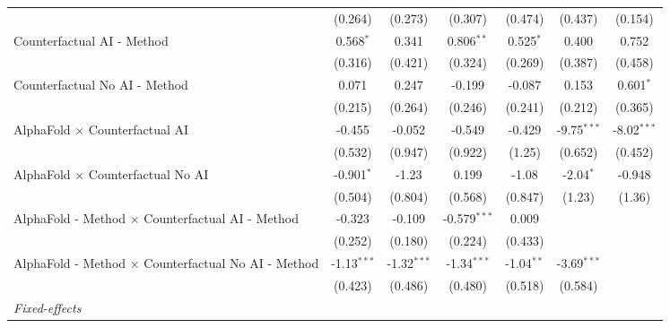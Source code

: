 \begin{tabular}{lcccccc}
                                                              & (0.264)       & (0.273)       & (0.307)        & (0.474)       & (0.437)       & (0.154)\\   
   Counterfactual AI - Method                                 & 0.568$^{*}$   & 0.341         & 0.806$^{**}$   & 0.525$^{*}$   & 0.400         & 0.752\\   
                                                              & (0.316)       & (0.421)       & (0.324)        & (0.269)       & (0.387)       & (0.458)\\   
   Counterfactual No AI - Method                              & 0.071         & 0.247         & -0.199         & -0.087        & 0.153         & 0.601$^{*}$\\   
                                                              & (0.215)       & (0.264)       & (0.246)        & (0.241)       & (0.212)       & (0.365)\\   
   AlphaFold $\times$ Counterfactual AI                       & -0.455        & -0.052        & -0.549         & -0.429        & -9.75$^{***}$ & -8.02$^{***}$\\   
                                                              & (0.532)       & (0.947)       & (0.922)        & (1.25)        & (0.652)       & (0.452)\\   
   AlphaFold $\times$ Counterfactual No AI                    & -0.901$^{*}$  & -1.23         & 0.199          & -1.08         & -2.04$^{*}$   & -0.948\\   
                                                              & (0.504)       & (0.804)       & (0.568)        & (0.847)       & (1.23)        & (1.36)\\   
   AlphaFold - Method $\times$ Counterfactual AI - Method     & -0.323        & -0.109        & -0.579$^{***}$ & 0.009         &               &   \\   
                                                              & (0.252)       & (0.180)       & (0.224)        & (0.433)       &               &   \\   
   AlphaFold - Method $\times$ Counterfactual No AI - Method  & -1.13$^{***}$ & -1.32$^{***}$ & -1.34$^{***}$  & -1.04$^{**}$  & -3.69$^{***}$ &   \\   
                                                              & (0.423)       & (0.486)       & (0.480)        & (0.518)       & (0.584)       &   \\   
   \midrule
   \emph{Fixed-effects}\\

\end{tabular}
